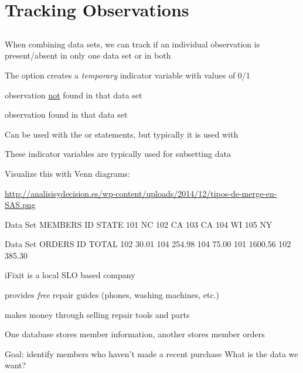 \section[Tracking Observations]{Tracking Observations}
\subsection{}
\begin{frame}
\end{frame}

\begin{frame}
\bi
\item When combining data sets, we can track if an individual observation is present/absent in only one data set or in both
\item The   option creates a \emph{temporary} indicator variable with values of 0/1
\bi
\item[0 =] observation \underline{not} found in that data set
\item[1 =] observation found in that data set
\ei
\item Can be used with the  or  statements, but typically it is used with 
\item These indicator variables are typically used for subsetting data
\item Visualize this with Venn diagrams:
\item[] \url{http://analisisydecision.es/wp-content/uploads/2014/12/tipos-de-merge-en-SAS.png}
\ei
\end{frame}


\begin{frame}[fragile]
\footnotesize
\begin{craw}{.0}{Data Set MEMBERS}
ID  STATE
101 NC
102 CA
103 CA
104 WI
105 NY
\end{craw}
\footnotesize
\begin{craw}{.0}{Data Set ORDERS}
ID  TOTAL
102 30.01
104 254.98
104 75.00
101 1600.56
102 385.30
\end{craw}
\emp
{} \hspace{0.05in} \emp
{}
\bi
\item iFixit is a local SLO based company
\bi
\item provides \emph{free} repair guides (phones, washing machines, etc.)
\item makes money through selling repair tools and parts
\ei
\item One database stores member information, another stores member orders
\item Goal: identify members who haven't made a recent purchase
\ei
\oyo What is the data we want?
\vskip20pt
\textcolor{White}{x}
\emp
\end{frame}

